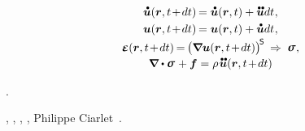 \nopagebreak\vspace{-0.2em}\begin{gather*}
\mathdotabove{\bm{u}}(\bm{r}, t \hspace{-0.3ex} + \hspace{-0.3ex} dt) \hspace{-0.2ex}
= \mathdotabove{\bm{u}}(\bm{r}, t) + \mathdotdotabove{\bm{u}} dt
\hspace{.1ex} ,
\\
\bm{u}(\bm{r}, t \hspace{-0.3ex} + \hspace{-0.3ex} dt) \hspace{-0.2ex}
= \bm{u}(\bm{r}, t) + \mathdotabove{\bm{u}} dt
\hspace{.1ex} ,
\\[-0.1em]
\infinitesimaldeformation(\bm{r}, t \hspace{-0.3ex} + \hspace{-0.3ex} dt) \hspace{-0.2ex}
= \hspace{-0.2ex} \bigl( \boldnabla \bm{u}(\bm{r}, t \hspace{-0.3ex} + \hspace{-0.3ex} dt) \bigr)^{\hspace{-0.25ex}\mathsf{S}}
\hspace{.2em} \Rightarrow \hspace{.25em}
\linearstress
\hspace{.1ex} ,
\\[-0.1em]
\boldnabla \dotp \linearstress \hspace{.15ex} + \bm{f}
= \rho \hspace{.2ex} \mathdotdotabove{\bm{u}}(\bm{r}, t \hspace{-0.3ex} + \hspace{-0.3ex} dt)
\end{gather*}

\vspace{-0.1em}\noindent
{}.

,   , , ,  Philippe Ciarlet~\cite{ciarlet-mathematicalelasticity}.


